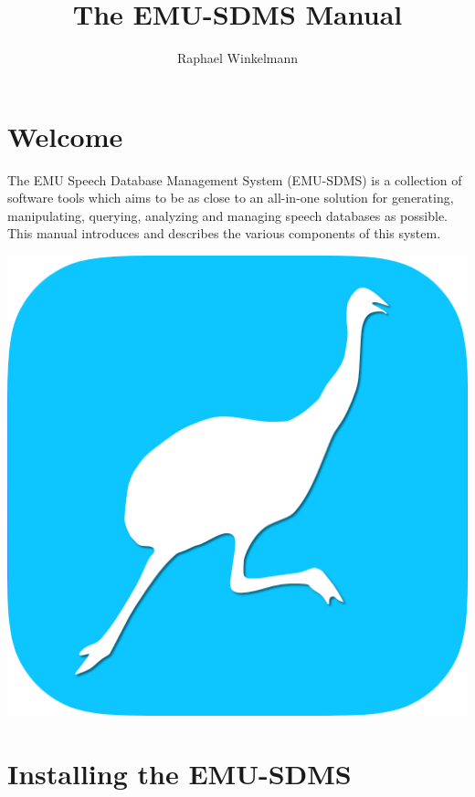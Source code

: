 \documentclass[]{book}
\title{The EMU-SDMS Manual}
\author{Raphael Winkelmann}
\date{}
\theoremstyle{definition}
\theoremstyle{definition}
\theoremstyle{definition}
\theoremstyle{remark}
\begin{document}
\maketitle

{
\setcounter{tocdepth}{1}
\tableofcontents
}
\hypertarget{welcome}{%
\chapter*{Welcome}\label{welcome}}

The EMU Speech Database Management System (EMU-SDMS) is a collection of
software tools which aims to be as close to an all-in-one solution for
generating, manipulating, querying, analyzing and managing speech
databases as possible. This manual introduces and describes the various
components of this system.

\begin{center}\includegraphics[width=0.35\linewidth]{pics/EMU-webAppIcon-roundCorners} \end{center}

\hypertarget{installing-the-emu-sdms}{%
\chapter{Installing the EMU-SDMS}\label{installing-the-emu-sdms}}
\end{document}
